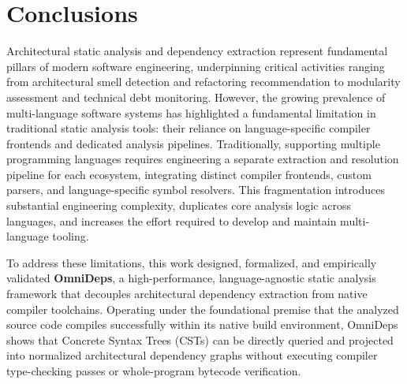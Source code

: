 \section{Conclusions}
\label{ch:conclusions}

Architectural static analysis and dependency extraction represent fundamental
pillars of modern software engineering, underpinning critical activities
ranging from architectural smell detection and refactoring recommendation to
modularity assessment and technical debt monitoring. However, the growing
prevalence of multi-language software systems has highlighted a fundamental
limitation in traditional static analysis tools: their reliance on
language-specific compiler frontends and dedicated analysis pipelines.
Traditionally, supporting multiple programming languages requires engineering a
separate extraction and resolution pipeline for each ecosystem, integrating
distinct compiler frontends, custom parsers, and language-specific symbol
resolvers. This fragmentation introduces substantial engineering complexity,
duplicates core analysis logic across languages, and increases the effort
required to develop and maintain multi-language tooling.

To address these limitations, this work designed, formalized, and
empirically validated \textbf{OmniDeps}, a high-performance, language-agnostic
static analysis framework that decouples architectural dependency extraction
from native compiler toolchains. Operating under the foundational premise
that the analyzed source code compiles successfully within its native build
environment, OmniDeps shows that Concrete Syntax Trees (CSTs) can be
directly queried and projected into normalized architectural dependency graphs
without executing compiler type-checking passes or whole-program bytecode
verification.

